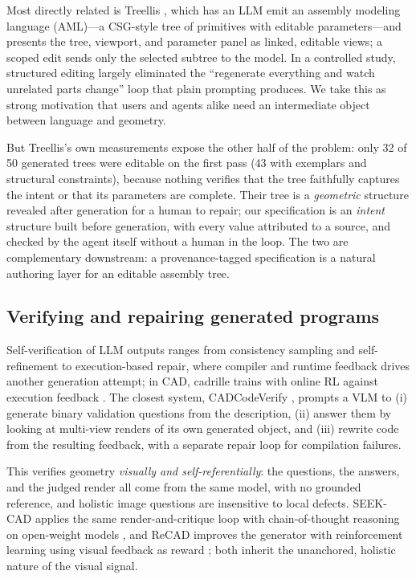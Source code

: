 Most directly related is Treellis \cite{treellis}, which has an LLM emit an
assembly modeling language (AML)---a CSG-style tree of primitives with
editable parameters---and presents the tree, viewport, and parameter panel as
linked, editable views; a scoped edit sends only the selected subtree to the
model. In a controlled study, structured editing largely eliminated the
``regenerate everything and watch unrelated parts change'' loop that plain
prompting produces. We take this as strong motivation that users and agents
alike need an intermediate object between language and geometry.

But Treellis's own measurements expose the other half of the problem: only 32
of 50 generated trees were editable on the first pass (43 with exemplars and
structural constraints), because nothing verifies that the tree faithfully
captures the intent or that its parameters are complete. Their tree is a
\emph{geometric} structure revealed after generation for a human to repair;
our specification is an \emph{intent} structure built before generation, with
every value attributed to a source, and checked by the agent itself without a
human in the loop. The two are complementary downstream: a
provenance-tagged specification is a natural authoring layer for an editable
assembly tree.

\subsection{Verifying and repairing generated programs}
\label{sec:related:verify}

Self-verification of LLM outputs ranges from consistency sampling
\cite{selfcheckgpt} and self-refinement \cite{selfrefine} to execution-based
repair, where compiler and runtime feedback drives another generation
attempt; in CAD, cadrille trains with online RL against execution feedback
\cite{cadrille}. The closest system, CADCodeVerify \cite{cadcodeverify},
prompts a VLM to (i) generate binary validation questions from the
description, (ii) answer them by looking at multi-view renders of its own
generated object, and (iii) rewrite code from the resulting feedback, with a
separate repair loop for compilation failures.

This verifies geometry \emph{visually and self-referentially}: the questions,
the answers, and the judged render all come from the same model, with no
grounded reference, and holistic image questions are insensitive to local
defects. SEEK-CAD applies the same render-and-critique loop with
chain-of-thought reasoning on open-weight models \cite{seekcad}, and ReCAD
improves the generator with reinforcement learning using visual feedback as
reward \cite{recad}; both inherit the unanchored, holistic nature of the
visual signal.

